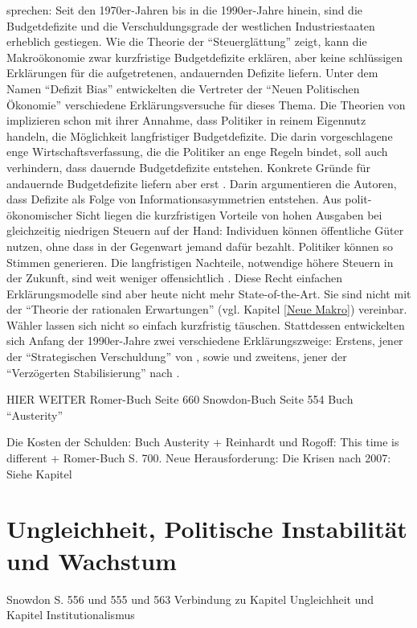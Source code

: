 sprechen: Seit den 1970er-Jahren bis in die 1990er-Jahre hinein, sind die Budgetdefizite und die Verschuldungsgrade der westlichen Industriestaaten erheblich gestiegen.  Wie die Theorie der "`Steuerglättung"' zeigt, kann die Makroökonomie zwar kurzfristige Budgetdefizite erklären, aber keine schlüssigen Erklärungen für die aufgetretenen, andauernden Defizite liefern. Unter dem Namen "`Defizit Bias"' entwickelten die Vertreter der "`Neuen Politischen Ökonomie"' verschiedene Erklärungsversuche für dieses Thema. Die Theorien von \textcite{Buchanan1962} implizieren schon mit ihrer Annahme, dass Politiker in reinem Eigennutz handeln, die Möglichkeit langfristiger Budgetdefizite. Die darin vorgeschlagene enge Wirtschaftsverfassung, die die Politiker an enge Regeln bindet, soll auch verhindern, dass dauernde Budgetdefizite entstehen. Konkrete Gründe für andauernde Budgetdefizite liefern aber erst \textcite{Buchanan1977}. Darin argumentieren die Autoren, dass Defizite als Folge von Informationsasymmetrien entstehen. Aus polit-ökonomischer Sicht liegen die kurzfristigen Vorteile von hohen Ausgaben bei gleichzeitig niedrigen Steuern auf der Hand: Individuen können öffentliche Güter nutzen, ohne dass in der Gegenwart jemand dafür bezahlt. Politiker können so Stimmen generieren. Die langfristigen Nachteile, notwendige höhere Steuern in der Zukunft, sind weit weniger offensichtlich \parencite[S. 679]{Romer2019}. Diese Recht einfachen Erklärungsmodelle sind aber heute nicht mehr State-of-the-Art. Sie sind nicht mit der "`Theorie der rationalen Erwartungen"' (vgl. Kapitel \ref{Neue Makro}) vereinbar. Wähler lassen sich nicht so einfach kurzfristig täuschen. Stattdessen entwickelten sich Anfang der 1990er-Jahre zwei verschiedene Erklärungszweige: Erstens, jener der "`Strategischen Verschuldung"' von \textcite{Persson1989}, sowie \textcite{Alesina1990} und zweitens, jener der "`Verzögerten Stabilisierung"' nach \textcite{Alesina1991}. 


HIER WEITER
Romer-Buch Seite 660
Snowdon-Buch Seite 554
Buch "`Austerity"'



Die Kosten der Schulden:
Buch Austerity + Reinhardt und Rogoff: This time is different + Romer-Buch S. 700.
Neue Herausforderung: Die Krisen nach 2007: Siehe Kapitel 

\section{Ungleichheit, Politische Instabilität und Wachstum}
Snowdon S. 556 und 555 und 563 Verbindung zu Kapitel Ungleichheit und Kapitel Institutionalismus


